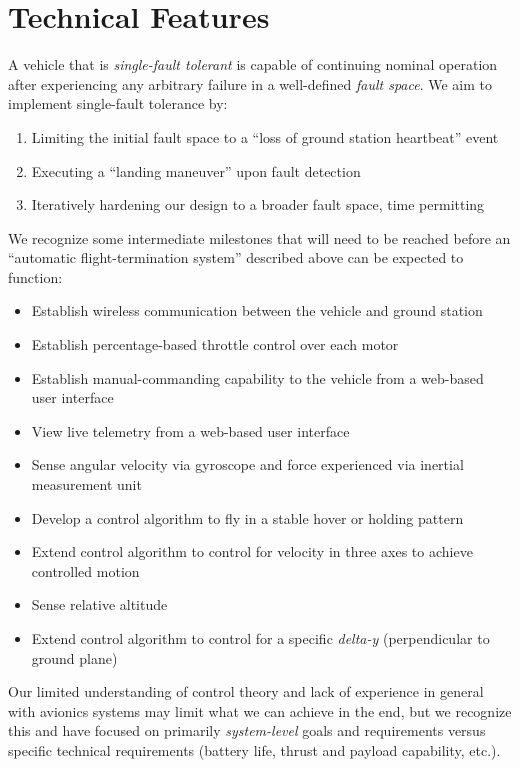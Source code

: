 \documentclass{article}
\begin{document}
\section{Technical Features}

A vehicle that is \textit{single-fault tolerant} is capable of continuing
nominal operation after experiencing any arbitrary failure in a well-defined
\textit{fault space}. We aim to implement single-fault tolerance by:

\begin{enumerate}
	\item Limiting the initial fault space to a ``loss of ground station
		heartbeat'' event
	\item Executing a ``landing maneuver'' upon fault detection
	\item Iteratively hardening our design to a broader fault space,
		time permitting
\end{enumerate}

We recognize some intermediate milestones that will need to be reached before
an ``automatic flight-termination system'' described above can be expected to
function:

\begin{itemize}
	\item Establish wireless communication between the vehicle and
		ground station
	\item Establish percentage-based throttle control over each motor
	\item Establish manual-commanding capability to the vehicle from a
		web-based user interface
	\item View live telemetry from a web-based user interface
	\item Sense angular velocity via gyroscope and force experienced via
		inertial measurement unit
	\item Develop a control algorithm to fly in a stable hover or
		holding pattern
	\item Extend control algorithm to control for velocity in three axes
		to achieve controlled motion
	\item Sense relative altitude
	\item Extend control algorithm to control for a specific \textit{delta-y}
		(perpendicular to ground plane) 
\end{itemize}

Our limited understanding of control theory and lack of experience in general
with avionics systems may limit what we can achieve in the end, but we
recognize this and have focused on primarily \textit{system-level} goals and
requirements versus specific technical requirements (battery life, thrust and
payload capability, etc.).
\end{document}
